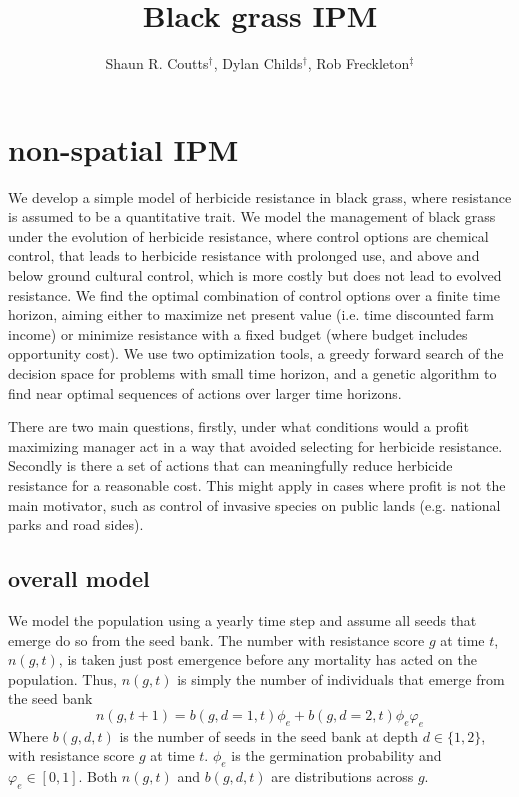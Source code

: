 \documentclass[12pt, a4paper]{article}
\begin{document}
\title{Black grass IPM}
\author{Shaun R. Coutts$^\dag$, Dylan Childs$^\dag$, Rob Freckleton$^\ddag$}
\maketitle
\section{non-spatial IPM}
We develop a simple model of herbicide resistance in black grass, where resistance is assumed to be a quantitative trait. We model the management of black grass under the evolution of herbicide resistance, where control options are chemical control, that leads to herbicide resistance with prolonged use, and above and below ground cultural control, which is more costly but does not lead to evolved resistance. We find the optimal combination of control options over a finite time horizon, aiming either to maximize net present value (i.e. time discounted farm income) or minimize resistance with a fixed budget (where budget includes opportunity cost). We use two optimization tools, a greedy forward search of the decision space for problems with small time horizon, and a genetic algorithm to find near optimal sequences of actions over larger time horizons.

There are two main questions, firstly, under what conditions would a profit maximizing manager act in a way that avoided selecting for herbicide resistance. Secondly is there a set of actions that can meaningfully reduce herbicide resistance for a reasonable cost. This might apply in cases where profit is not the main motivator, such as control of invasive species on public lands (e.g. national parks and road sides).                  

\subsection{overall model}
We model the population using a yearly time step and assume all seeds that emerge do so from the seed bank. The number with resistance score $g$ at time $t$, $n(g, t)$, is taken just post emergence before any mortality has acted on the population. Thus, $n(g, t)$ is simply the number of individuals that emerge from the seed bank    
\begin{equation}\label{eq:estab}
	n(g, t + 1) = b(g, d = 1, t)\phi_e + b(g, d = 2, t)\phi_e\varphi_e		
\end{equation} 
Where $b(g, d, t)$ is the number of seeds in the seed bank at depth $d \in \{1, 2\}$, with resistance score $g$ at time $t$. $\phi_e$ is the germination probability and $\varphi_e \in [0, 1]$. Both $n(g, t)$ and $b(g, d, t)$ are distributions across $g$.  
\end{document}
